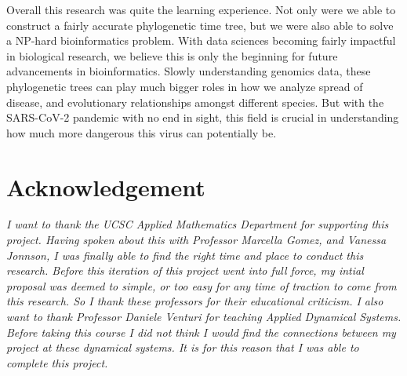 Overall this research was quite the learning experience. Not only were we able to construct a fairly accurate phylogenetic time tree, but we were also able to solve a NP-hard bioinformatics problem. With data sciences becoming fairly impactful in biological research, we believe this is only the beginning for future advancements in bioinformatics. Slowly understanding genomics data, these phylogenetic trees can play much bigger roles in how we analyze spread of disease, and evolutionary relationships amongst different species. But with the SARS-CoV-2 pandemic with no end in sight, this field is crucial in understanding how much more dangerous this virus can potentially be. 

\section{Acknowledgement}

\emph{I want to thank the UCSC Applied Mathematics Department for supporting this project. Having spoken about this with Professor Marcella Gomez, and Vanessa Jonnson, I was finally able to find the right time and place to conduct this research. Before this iteration of this project went into full force, my intial proposal was deemed to simple, or too easy for any time of traction to come from this research. So I thank these professors for their educational criticism. I also want to thank Professor Daniele Venturi for teaching Applied Dynamical Systems. Before taking this course I did not think I would find the connections between my project at these dynamical systems. It is for this reason that I was able to complete this project.}


